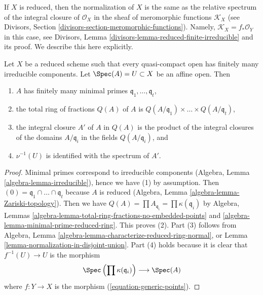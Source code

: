 \noindent
If $X$ is reduced, then the normalization of $X$ is the same
as the relative spectrum of the integral closure of $\mathcal{O}_X$
in the sheaf of meromorphic functions $\mathcal{K}_X$
(see Divisors, Section \ref{divisors-section-meromorphic-functions}).
Namely, $\mathcal{K}_X = f_*\mathcal{O}_Y$ in this case, see
Divisors, Lemma \ref{divisors-lemma-reduced-finite-irreducible}
and its proof. We describe this here explicitly.

\begin{lemma}
\label{lemma-description-normalization}
Let $X$ be a reduced scheme such that every quasi-compact open has
finitely many irreducible components. Let $\Spec(A) = U \subset X$
be an affine open. Then
\begin{enumerate}
\item $A$ has finitely many minimal primes
$\mathfrak q_1, \ldots, \mathfrak q_t$,
\item the total ring of fractions $Q(A)$ of $A$ is
$Q(A/\mathfrak q_1) \times \ldots \times Q(A/\mathfrak q_t)$,
\item the integral closure $A'$ of $A$ in $Q(A)$ is the product of
the integral closures of the domains $A/\mathfrak q_i$
in the fields $Q(A/\mathfrak q_i)$, and
\item $\nu^{-1}(U)$ is identified with the spectrum of $A'$.
\end{enumerate}
\end{lemma}

\begin{proof}
Minimal primes correspond to irreducible components
(Algebra, Lemma \ref{algebra-lemma-irreducible}),
hence we have (1) by assumption. Then
$(0) = \mathfrak q_1 \cap \ldots \cap \mathfrak q_t$ because $A$ is reduced
(Algebra, Lemma \ref{algebra-lemma-Zariski-topology}).
Then we have
$Q(A) = \prod A_{\mathfrak q_i} = \prod \kappa(\mathfrak q_i)$
by Algebra, Lemmas \ref{algebra-lemma-total-ring-fractions-no-embedded-points}
and \ref{algebra-lemma-minimal-prime-reduced-ring}.
This proves (2). Part (3) follows from
Algebra, Lemma \ref{algebra-lemma-characterize-reduced-ring-normal},
or Lemma \ref{lemma-normalization-in-disjoint-union}.
Part (4) holds because it is clear that $f^{-1}(U) \to U$ is the morphism
$$
\Spec\left(\prod \kappa(\mathfrak q_i)\right)
\longrightarrow
\Spec(A)
$$
where $f : Y \to X$ is the morphism (\ref{equation-generic-points}).
\end{proof}

